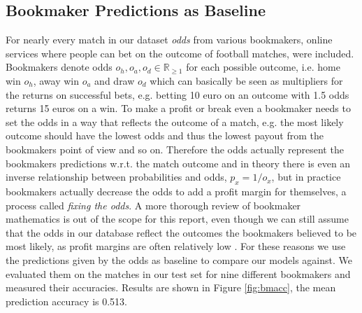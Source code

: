 \documentclass[a4paper]{article}
\begin{document}
\subsection{Bookmaker Predictions as Baseline}
For nearly every match in our dataset \textit{odds} from various bookmakers,
online services where people can bet on the outcome of football matches, were
included. Bookmakers denote odds $o_h, o_a, o_d \in \mathbb{R}_{\geq 1}$ for
each possible outcome, i.e. home win $o_h$, away win $o_a$ and draw $o_d$ which
can basically be seen as multipliers for the returns on successful bets, e.g.
betting 10 euro on an outcome with 1.5 odds returns 15 euros on a win. To make a
profit or break even a bookmaker needs to set the odds in a way that reflects
the outcome of a match, e.g. the most likely outcome should have the lowest odds
and thus the lowest payout from the bookmakers point of view and so on.
Therefore the odds actually represent the bookmakers predictions w.r.t. the
match outcome and in theory there is even an inverse relationship between
probabilities and odds, $p_x = 1/o_x$, but in practice bookmakers actually
decrease the odds to add a profit margin for themselves, a process called
\textit{fixing the odds}. A more thorough review of bookmaker mathematics is out
of the scope for this report, even though we can still assume that the odds in
our database reflect the outcomes the bookmakers believed to be most likely, as profit margins are often relatively low \cite{BookmakerEfficiencyPaper}. For these reasons we use the predictions given by the odds as baseline to
compare our models against. We evaluated them on the matches in our
test set for nine different bookmakers and measured their accuracies. Results are shown
in Figure \ref{fig:bmacc}, the mean prediction accuracy is 0.513.
\end{document}
